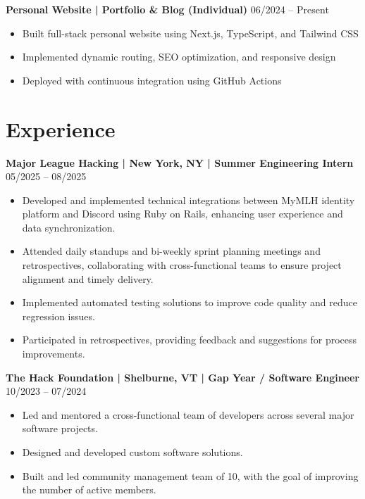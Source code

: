 \documentclass[10pt,letterpaper]{article}
\begin{document}
\vspace{4pt}
\noindent
\textbf{Personal Website | Portfolio \& Blog (Individual)} \hfill 06/2024 -- Present
\begin{itemize}
    \item Built full-stack personal website using Next.js, TypeScript, and Tailwind CSS
    \item Implemented dynamic routing, SEO optimization, and responsive design
    \item Deployed with continuous integration using GitHub Actions
\end{itemize}

\section{Experience}
\noindent
\textbf{Major League Hacking | New York, NY | Summer Engineering Intern} \hfill 05/2025 -- 08/2025
\begin{itemize}
    \item Developed and implemented technical integrations between MyMLH identity platform and Discord using Ruby on Rails, enhancing user experience and data synchronization.
    \item Attended daily standups and bi-weekly sprint planning meetings and retrospectives, collaborating with cross-functional teams to ensure project alignment and timely delivery.
    \item Implemented automated testing solutions to improve code quality and reduce regression issues.
    \item Participated in retrospectives, providing feedback and suggestions for process improvements.
\end{itemize}

\vspace{4pt}
\noindent
\textbf{The Hack Foundation | Shelburne, VT | Gap Year / Software Engineer} \hfill 10/2023 -- 07/2024
\begin{itemize}
    \item Led and mentored a cross-functional team of developers across several major software projects.
    \item Designed and developed custom software solutions.
    \item Built and led community management team of 10, with the goal of improving the number of active members.
\end{itemize}
\end{document}
